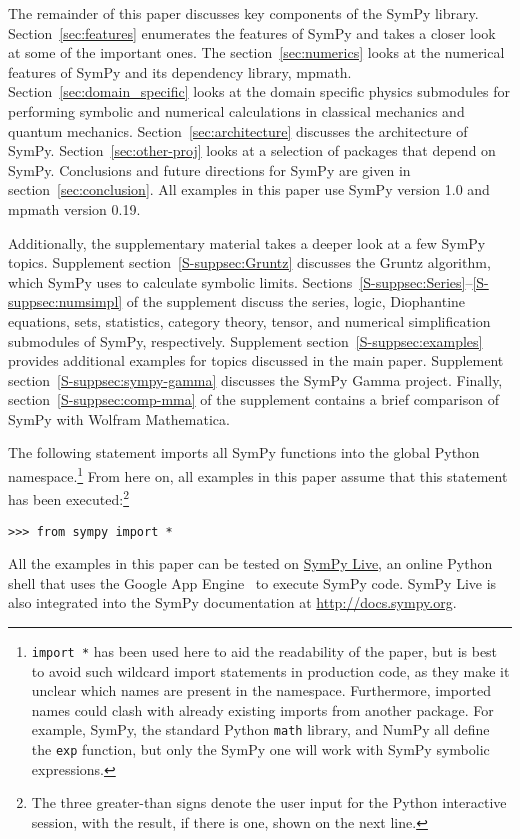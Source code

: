 The remainder of this paper discusses key components of the SymPy library.
Section~\ref{sec:features} enumerates the features of SymPy and takes a closer
look at some of the important ones. The section~\ref{sec:numerics} looks at
the numerical features of SymPy and its dependency library, mpmath.
Section~\ref{sec:domain_specific} looks at the domain specific physics
submodules for performing symbolic and numerical calculations in classical
mechanics and quantum mechanics. Section~\ref{sec:architecture} discusses the
architecture of SymPy. Section~\ref{sec:other-proj} looks at a selection of
packages that depend on SymPy. Conclusions and future directions for SymPy are given
in section~\ref{sec:conclusion}. All examples in this paper use SymPy version
1.0 and mpmath version 0.19.

Additionally, the supplementary material takes a deeper look at a few SymPy
topics. Supplement section~\ref{S-suppsec:Gruntz} discusses the Gruntz
algorithm, which SymPy uses to calculate symbolic limits.
Sections~\ref{S-suppsec:Series}--\ref{S-suppsec:numsimpl} of the supplement
discuss the series, logic, Diophantine equations, sets, statistics, category
theory, tensor, and numerical simplification submodules of SymPy,
respectively. Supplement section~\ref{S-suppsec:examples} provides additional
examples for topics discussed in the main paper. Supplement
section~\ref{S-suppsec:sympy-gamma} discusses the SymPy Gamma project.
Finally, section~\ref{S-suppsec:comp-mma} of the supplement contains a brief
comparison of SymPy with Wolfram Mathematica.

The following statement imports all SymPy functions into the global Python
namespace.\footnote{\texttt{import *} has been used here to aid the
  readability of the paper, but is best to avoid such wildcard import
  statements in production code, as they make it unclear which names are
  present in the namespace. Furthermore, imported names could clash with
  already existing imports from another package. For example, SymPy, the
  standard Python \texttt{math} library, and NumPy all define the \texttt{exp}
  function, but only the SymPy one will work with SymPy symbolic expressions.}
From here on, all examples in this paper assume that this statement has been
executed:\footnote{\label{note:prompt} The three greater-than signs denote the user input for the
  Python interactive session, with the result, if there is one, shown on the
  next line.}

\begin{verbatim}
>>> from sympy import *
\end{verbatim}

All the examples in this paper can be tested on
\href{http://live.sympy.org}{SymPy Live}, an online Python shell that uses the
Google App Engine~\cite{ciurana2009developing} to execute SymPy code. SymPy Live
is also integrated into the SymPy documentation at
\href{http://docs.sympy.org}{http://docs.sympy.org}.
